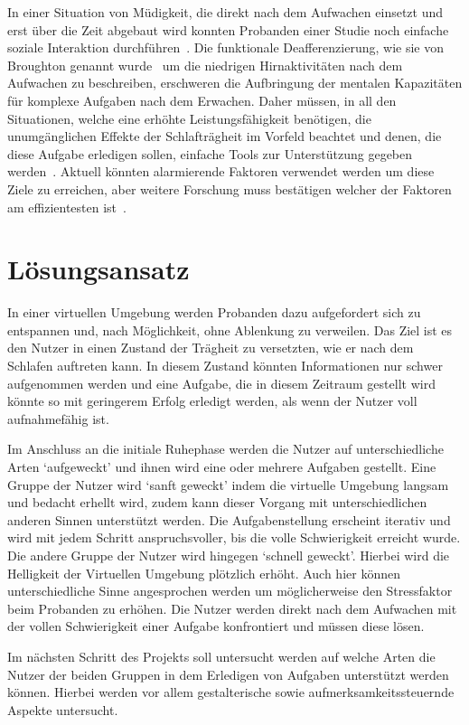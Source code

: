 \documentclass[a4paper, 11pt]{article}
\begin{document}
In einer Situation von Müdigkeit, die direkt nach dem Aufwachen einsetzt und erst über die Zeit abgebaut wird konnten Probanden einer Studie noch einfache soziale Interaktion durchführen~\cite{dinges1990you}. Die funktionale Deafferenzierung, wie sie von Broughton genannt wurde~\cite{broughton1968sleep} um die niedrigen Hirnaktivitäten nach dem Aufwachen zu beschreiben, erschweren die Aufbringung der mentalen Kapazitäten für komplexe Aufgaben nach dem Erwachen. Daher müssen, in all den Situationen, welche eine erhöhte Leistungsfähigkeit benötigen, die unumgänglichen Effekte der Schlafträgheit im Vorfeld beachtet und denen, die diese Aufgabe erledigen sollen, einfache Tools zur Unterstützung gegeben werden~\cite{ferrara2000sleep}. Aktuell könnten alarmierende Faktoren verwendet werden um diese Ziele zu erreichen, aber weitere Forschung muss bestätigen welcher der Faktoren am effizientesten ist~\cite{ferrara2000sleep}.

\section*{Lösungsansatz}
In einer virtuellen Umgebung werden Probanden dazu aufgefordert sich zu entspannen und, nach Möglichkeit, ohne Ablenkung zu verweilen. Das Ziel ist es den Nutzer in einen Zustand der Trägheit zu versetzten, wie er nach dem Schlafen auftreten kann. In diesem Zustand könnten Informationen nur schwer aufgenommen werden und eine Aufgabe, die in diesem Zeitraum gestellt wird könnte so mit geringerem Erfolg erledigt werden, als wenn der Nutzer voll aufnahmefähig ist. 

Im Anschluss an die initiale Ruhephase werden die Nutzer auf unterschiedliche Arten `auf\-geweckt' und ihnen wird eine oder mehrere Aufgaben gestellt. Eine Gruppe der Nutzer wird `sanft geweckt' indem die virtuelle Umgebung langsam und bedacht erhellt wird, zudem kann dieser Vorgang mit unterschiedlichen anderen Sinnen unterstützt werden. Die Aufgabenstellung erscheint iterativ und wird mit jedem Schritt anspruchsvoller, bis die volle Schwierigkeit erreicht wurde. 
Die andere Gruppe der Nutzer wird hingegen `schnell geweckt'. Hierbei wird die Helligkeit der Virtuellen Umgebung plötzlich erhöht. Auch hier können unterschiedliche Sinne angesprochen werden um möglicherweise den Stressfaktor beim Probanden zu erhöhen. Die Nutzer werden direkt nach dem Aufwachen mit der vollen Schwierigkeit einer Aufgabe konfrontiert und müssen diese lösen.

Im nächsten Schritt des Projekts soll untersucht werden auf welche Arten die Nutzer der beiden Gruppen in dem Erledigen von Aufgaben unterstützt werden können. Hierbei werden vor allem gestalterische sowie aufmerksamkeitssteuernde Aspekte untersucht. 
\end{document}
